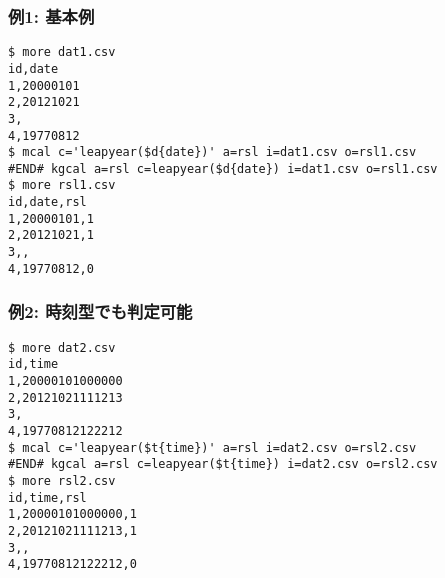 \subsubsection*{例1: 基本例}



\begin{Verbatim}[baselinestretch=0.7,frame=single]
$ more dat1.csv
id,date
1,20000101
2,20121021
3,
4,19770812
$ mcal c='leapyear($d{date})' a=rsl i=dat1.csv o=rsl1.csv
#END# kgcal a=rsl c=leapyear($d{date}) i=dat1.csv o=rsl1.csv
$ more rsl1.csv
id,date,rsl
1,20000101,1
2,20121021,1
3,,
4,19770812,0
\end{Verbatim}
\subsubsection*{例2: 時刻型でも判定可能}



\begin{Verbatim}[baselinestretch=0.7,frame=single]
$ more dat2.csv
id,time
1,20000101000000
2,20121021111213
3,
4,19770812122212
$ mcal c='leapyear($t{time})' a=rsl i=dat2.csv o=rsl2.csv
#END# kgcal a=rsl c=leapyear($t{time}) i=dat2.csv o=rsl2.csv
$ more rsl2.csv
id,time,rsl
1,20000101000000,1
2,20121021111213,1
3,,
4,19770812122212,0
\end{Verbatim}
